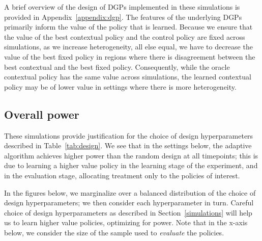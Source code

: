 \documentclass[letterpaper, 12pt, parskip=full,DIV=10]{scrartcl}
\begin{document}
A brief overview of the design of DGPs implemented in these simulations is provided in Appendix~\ref{appendix:dgp}. The features of the underlying DGPs primarily inform the value of the policy that is learned. Because we ensure that the value of the best contextual policy and the control policy are fixed across simulations, as we increase heterogeneity, all else equal, we have to decrease the value of the best fixed policy in regions where there is disagreement between the best contextual and the best fixed policy. Consequently, while the oracle contextual policy has the same value across simulations, the learned contextual policy may be of lower value in settings where there is more heterogeneity. %


\FloatBarrier
\subsection{Overall power}
These simulations provide justification for the choice of design hyperparameters described in Table~\ref{tab:design}. We see that in the settings below, the adaptive algorithm achieves higher power than the random design at all timepoints; this is due to learning a higher value policy in the learning stage of the experiment, and in the evaluation stage, allocating treatment only to the policies of interest. 

In the figures below, we marginalize over a balanced distribution of the choice of design hyperparameters; we then consider each hyperparameter in turn. Careful choice of design hyperparameters as described in Section~\ref{simulations} will help us to learn higher value policies, optimizing for power. Note that in the x-axis below, we consider the size of the sample used to \textit{evaluate} the policies.  
\end{document}
